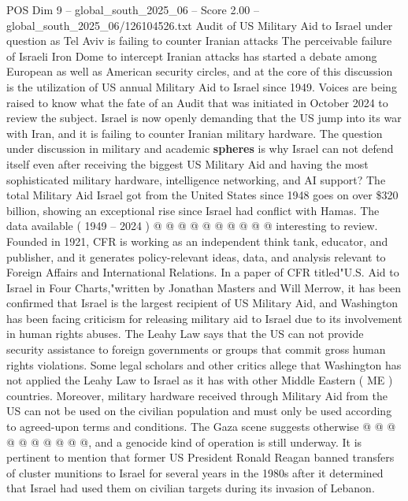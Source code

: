 \begin{textsample}{POS Dim 9 – global\_south\_2025\_06 – Score 2.00 – global\_south\_2025\_06/126104526.txt}  \label{ex:f9_pos_175}
Audit of US Military Aid to Israel under question as Tel Aviv is failing to counter Iranian attacks The perceivable failure of Israeli Iron Dome to intercept Iranian attacks has started a debate among European as well as American security circles, and at the core of this discussion is the utilization of US annual Military Aid to Israel since 1949.
Voices are being raised to know what the fate of an Audit that was initiated in October 2024 to review the subject.
Israel is now openly demanding that the US jump into its war with Iran, and it is failing to counter Iranian military hardware.
The question under discussion in military and academic \textbf{spheres} is why Israel can not defend itself even after receiving the biggest US Military Aid and having the most sophisticated military hardware, intelligence networking, and AI support?
The total Military Aid Israel got from the United States since 1948 goes on over \$320 billion, showing an exceptional rise since Israel had conflict with Hamas.
The data available ( 1949 -- 2024 ) @ @ @ @ @ @ @ @ @ @ interesting to review.
Founded in 1921, CFR is working as an independent think tank, educator, and publisher, and it generates policy-relevant ideas, data, and analysis relevant to Foreign Affairs and International Relations.
In a paper of CFR titled"U.S.
Aid to Israel in Four Charts,"written by Jonathan Masters and Will Merrow, it has been confirmed that Israel is the largest recipient of US Military Aid, and Washington has been facing criticism for releasing military aid to Israel due to its involvement in human rights abuses.
The Leahy Law says that the US can not provide security assistance to foreign governments or groups that commit gross human rights violations.
Some legal scholars and other critics allege that Washington has not applied the Leahy Law to Israel as it has with other Middle Eastern ( ME ) countries.
Moreover, military hardware received through Military Aid from the US can not be used on the civilian population and must only be used according to agreed-upon terms and conditions.
The Gaza scene suggests otherwise @ @ @ @ @ @ @ @ @ @, and a genocide kind of operation is still underway.
It is pertinent to mention that former US President Ronald Reagan banned transfers of cluster munitions to Israel for several years in the 1980s after it determined that Israel had used them on civilian targets during its invasion of Lebanon.

\end{textsample}
